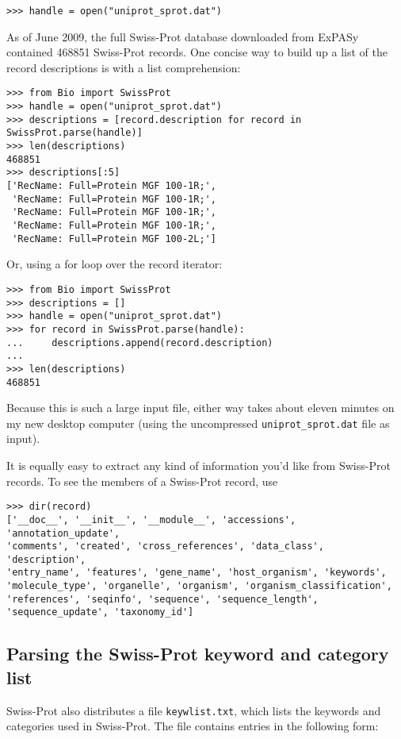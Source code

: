 \documentclass{report}
\begin{document}
\begin{verbatim}
>>> handle = open("uniprot_sprot.dat")
\end{verbatim}

As of June 2009, the full Swiss-Prot database downloaded from ExPASy contained 468851 Swiss-Prot records.  One concise way to build up a list of the record descriptions is with a list comprehension: 
\begin{verbatim}
>>> from Bio import SwissProt
>>> handle = open("uniprot_sprot.dat")
>>> descriptions = [record.description for record in SwissProt.parse(handle)]
>>> len(descriptions)
468851
>>> descriptions[:5]
['RecName: Full=Protein MGF 100-1R;',
 'RecName: Full=Protein MGF 100-1R;',
 'RecName: Full=Protein MGF 100-1R;',
 'RecName: Full=Protein MGF 100-1R;',
 'RecName: Full=Protein MGF 100-2L;']

\end{verbatim}

Or, using a for loop over the record iterator:
\begin{verbatim}
>>> from Bio import SwissProt
>>> descriptions = []
>>> handle = open("uniprot_sprot.dat")
>>> for record in SwissProt.parse(handle):
...     descriptions.append(record.description)
...
>>> len(descriptions)
468851
\end{verbatim}

Because this is such a large input file, either way takes about eleven minutes on my new desktop computer (using the uncompressed \verb|uniprot_sprot.dat| file as input).

It is equally easy to extract any kind of information you'd like from Swiss-Prot records. To see the members of a Swiss-Prot record, use
\begin{verbatim}
>>> dir(record)
['__doc__', '__init__', '__module__', 'accessions', 'annotation_update',
'comments', 'created', 'cross_references', 'data_class', 'description',
'entry_name', 'features', 'gene_name', 'host_organism', 'keywords',
'molecule_type', 'organelle', 'organism', 'organism_classification',
'references', 'seqinfo', 'sequence', 'sequence_length',
'sequence_update', 'taxonomy_id']
\end{verbatim}

\subsection{Parsing the Swiss-Prot keyword and category list}

Swiss-Prot also distributes a file \verb+keywlist.txt+, which lists the keywords and categories used in Swiss-Prot. The file contains entries in the following form:
\end{document}
